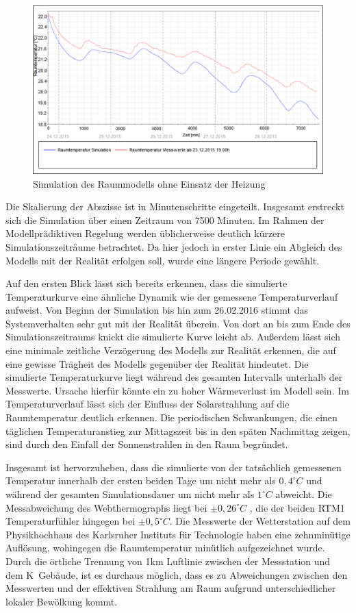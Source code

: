 \begin{figure}
\centering
\includegraphics[width=\textwidth]{abbildungen/20160328_validierung1}
\caption{Simulation des Raummodells ohne Einsatz der Heizung}
\label{fig:valid1}
\end{figure}

Die Skalierung der Abszisse ist in Minutenschritte eingeteilt. Insgesamt erstreckt sich die Simulation über einen Zeitraum von 7500 Minuten. Im Rahmen der Modellprädiktiven Regelung werden üblicherweise deutlich kürzere Simulationszeiträume betrachtet. Da hier jedoch in erster Linie ein Abgleich des Modells mit der Realität erfolgen soll, wurde eine längere Periode gewählt.

Auf den ersten Blick lässt sich bereits erkennen, dass die simulierte Temperaturkurve eine ähnliche Dynamik wie der gemessene Temperaturverlauf aufweist. Von Beginn der Simulation bis hin zum 26.02.2016 stimmt das Systemverhalten sehr gut mit der Realität überein. Von dort an bis zum Ende des Simulationszeitraums knickt die simulierte Kurve leicht ab. 
Außerdem lässt sich eine minimale zeitliche Verzögerung des Modells zur Realität erkennen, die auf eine gewisse Trägheit des Modells gegenüber der Realität hindeutet.
Die simulierte Temperaturkurve liegt während des gesamten Intervalls unterhalb der Messwerte. Ursache hierfür könnte ein zu hoher Wärmeverlust im Modell sein.  
Im Temperaturverlauf lässt sich der Einfluss der Solarstrahlung auf die Raumtemperatur deutlich erkennen. Die periodischen Schwankungen, die einen täglichen Temperaturanstieg zur Mittagszeit bis in den späten Nachmittag zeigen, sind durch den Einfall der Sonnenstrahlen in den Raum begründet. 

Insgesamt ist hervorzuheben, dass die simulierte von der tatsächlich gemessenen Temperatur innerhalb der ersten beiden Tage um nicht mehr als $0,4^{\circ}C$ und während der gesamten Simulationsdauer um nicht mehr als $1^{\circ}C$ abweicht.
Die Messabweichung des Webthermographs liegt bei $\pm 0,26^{\circ}C$ , die der beiden RTM1 Temperaturfühler hingegen bei $\pm 0,5^{\circ}C$.
Die Messwerte der Wetterstation auf dem Physikhochhaus des Karlsruher Instituts für Technologie haben eine zehnminütige Auflösung, wohingegen die Raumtemperatur minütlich aufgezeichnet wurde.
Durch die örtliche Trennung von 1km Luftlinie zwischen der Messstation und dem K~Gebäude, ist es durchaus möglich, dass es zu Abweichungen zwischen den Messwerten und der effektiven Strahlung am Raum aufgrund unterschiedlicher lokaler Bewölkung kommt. 

